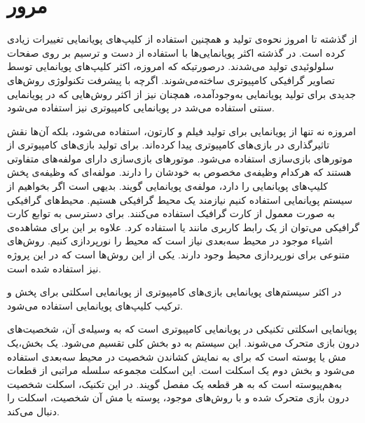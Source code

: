 \chapter { مرور }



از گذشته تا امروز نحوه‌ی تولید و همچنین استفاده از کلیپ‌های پویانمایی تغییرات زیادی کرده است.
در گذشته اکثر پویانمایی‌ها با استفاده از دست و ترسیم بر روی صفحات سلولوئیدی تولید می‌شدند.
درصورتیکه که امروزه، اکثر کلیپ‌های پویانمایی توسط تصاویر گرافیکی کامپیوتری ساخته‌می‌شوند.
اگرچه با پیشرفت تکنولوژی روش‌های جدیدی برای تولید پویانمایی به‌وجودآمده، همچنان نیز از اکثر روش‌هایی که در 
پویانمایی سنتی استفاده می‌شد در پویانمایی کامپیوتری نیز استفاده می‌شود.

امروزه نه تنها از پویانمایی برای تولید فیلم و کارتون، استفاده می‌شود، بلکه آن‌ها نقش 
تاثیرگذاری در بازی‌های کامپیوتری پیدا کرده‌اند.
برای تولید بازی‌های کامپیوتری از موتور‌های بازی‌سازی استفاده می‌شود.
موتور‌های بازی‌سازی دارای مولفه‌های متفاوتی هستند که هرکدام وظیفه‌ی مخصوص به خودشان را دارند.
مولفه‌ای که وظیفه‌ی پخش کلیپ‌های پویانمایی را دارد، مولفه‌ی پویانمایی گویند.
بدیهی است اگر بخواهیم از سیستم پویانمایی استفاده کنیم نیازمند یک محیط گرافیکی هستیم.
محیط‌های گرافیکی به صورت معمول از کارت گرافیک استفاده می‌کنند. برای دسترسی به توابع 
کارت گرافیکی می‌توان از یک رابط کاربری مانند 
یا
استفاده کرد.
علاوه بر این برای مشاهده‌ی اشیاء موجود در محیط سه‌بعدی نیاز است که محیط را نورپردازی کنیم.
روش‌های متنوعی برای نورپردازی محیط وجود دارند. یکی از این روش‌ها 
است که در این پروژه نیز استفاده شده است.

در اکثر سیستم‌های پویانمایی بازی‌های کامپیوتری از پویانمایی اسکلتی برای پخش و ترکیب کلیپ‌های پویانمایی 
استفاده می‌شود.

پویانمایی اسکلتی تکنیکی در پویانمایی کامپیوتری است که به وسیله‌ی آن، شخصیت‌های درون بازی متحرک می‌شوند. 
این سیستم به دو بخش کلی تقسیم می‌شود.
یک بخش،یک مش یا پوسته است که برای به نمایش کشاندن شخصیت در محیط سه‌بعدی استفاده می‌شود و بخش دوم یک اسکلت است. این اسکلت مجموعه سلسله مراتبی از قطعات به‌‌هم‌پیوسته است که به هر قطعه یک مفصل گویند.
در این تکنیک، اسکلت شخصیت درون بازی متحرک شده و با روش‌های موجود، پوسته یا مش آن شخصیت، اسکلت را دنبال می‌کند.


